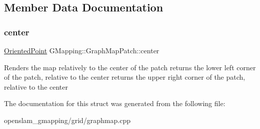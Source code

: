 \subsection{Member Data Documentation}
\mbox{\label{structGMapping_1_1GraphMapPatch_a4bf62b1576ad0bfbf58cbb2ca9d4b6c8}} 
\subsubsection{\texorpdfstring{center}{center}}
{\footnotesize\ttfamily \hyperlink{structGMapping_1_1orientedpoint}{Oriented\+Point} G\+Mapping\+::\+Graph\+Map\+Patch\+::center}

Renders the map relatively to the center of the patch returns the lower left corner of the patch, relative to the center returns the upper right corner of the patch, relative to the center 

The documentation for this struct was generated from the following file\+:\begin{DoxyCompactItemize}
\item 
openslam\+\_\+gmapping/grid/graphmap.\+cpp\end{DoxyCompactItemize}
